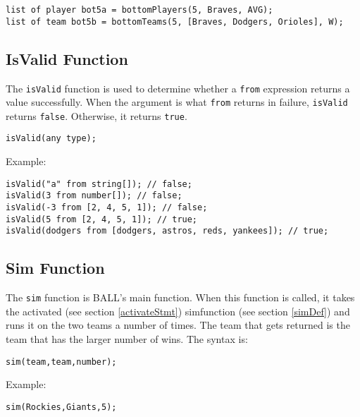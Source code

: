 \begin{verbatim}
list of player bot5a = bottomPlayers(5, Braves, AVG);
list of team bot5b = bottomTeams(5, [Braves, Dodgers, Orioles], W);
\end{verbatim}

\subsection{IsValid Function}
The \texttt{isValid} function is used to determine whether a
\texttt{from} expression returns a value successfully. When the
argument is what \texttt{from} returns in failure, \texttt{isValid}
returns \texttt{false}. Otherwise, it returns \texttt{true}.

\begin{verbatim}
isValid(any type);
\end{verbatim}
Example: 
\begin{verbatim}
isValid("a" from string[]); // false;
isValid(3 from number[]); // false;
isValid(-3 from [2, 4, 5, 1]); // false;
isValid(5 from [2, 4, 5, 1]); // true;
isValid(dodgers from [dodgers, astros, reds, yankees]); // true;
\end{verbatim}

\subsection{Sim Function}
The \texttt{sim} function is BALL's main function. When this function
is called, it takes the activated (see section \ref{activateStmt})
simfunction (see section \ref{simDef}) and runs it on the two teams a
number of times. The team that gets returned is the team that has the
larger number of wins. The syntax is:
\begin{verbatim}
sim(team,team,number);
\end{verbatim}
Example: 
\begin{verbatim}
sim(Rockies,Giants,5); 
\end{verbatim}

\pagebreak
